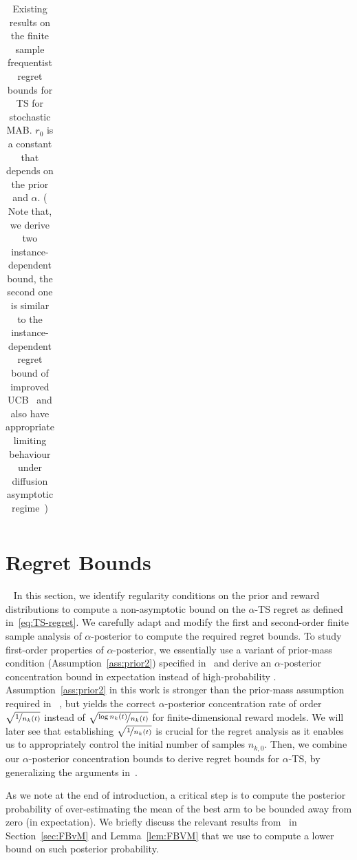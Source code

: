 \documentclass[11pt]{article}
\begin{document}
\begin{table}[t]
{\begin{tabular}{@{}ccccc@{}}
  \\ \bottomrule
\end{tabular}%
}
\caption{Existing results on the finite sample frequentist regret bounds for TS for stochastic MAB. $r_0$ is a constant that depends on the prior and $\alpha$. ( Note that, we derive two instance-dependent bound, the second one is similar to the instance-dependent regret bound of improved UCB~\cite{Auer2010} and also have appropriate limiting behaviour under diffusion asymptotic regime~\cite[ Sec. 4(pg. 24)]{Wager21})}
\label{tab:my-table}
\end{table}

\section{Regret Bounds}~\label{sec:RB}
   In this section, we identify regularity conditions on the prior and reward distributions to compute a non-asymptotic bound on the $\alpha$-TS regret as defined in~\eqref{eq:TS-regret}. We carefully adapt and modify the first and second-order finite sample analysis of $\alpha$-posterior to compute the required regret bounds. %
    To study first-order properties of $\alpha$-posterior, we essentially use a variant of prior-mass condition (Assumption~\ref{ass:prior2}) specified in{~\cite[(2.9)]{GGV}} and derive an $\alpha$-posterior concentration bound in expectation instead of high-probability . Assumption~\ref{ass:prior2} in this work is stronger than the prior-mass assumption required in ~\cite{bhattacharya2019bayesian}, but yields the correct $\alpha$-posterior concentration rate of order $\sqrt{\nicefrac{1}{n_k(t)}}$ instead of $\sqrt{\nicefrac{\log n_{k}(t)}{n_{k}(t)}} $ for finite-dimensional reward models. We will later see that establishing $\sqrt{\nicefrac{1}{n_{k}(t)}}$ is crucial for the regret analysis as it enables us to appropriately control the initial number of samples $n_{k,0}$. %
Then, we combine our $\alpha$-posterior concentration bounds to derive regret bounds for $\alpha$-TS, by generalizing the arguments in~\cite{agrawal2013further}. 

 
As we note at the end of introduction, a critical step is to compute the posterior probability of over-estimating the mean of the best arm to be bounded away from zero (in expectation). %
We briefly discuss the relevant results from~\cite{Spokoiny2012,Panov2015} in Section~\ref{sec:FBvM} and Lemma~\ref{lem:FBVM} that we use to compute a lower bound on such posterior probability.
        
\end{document}
